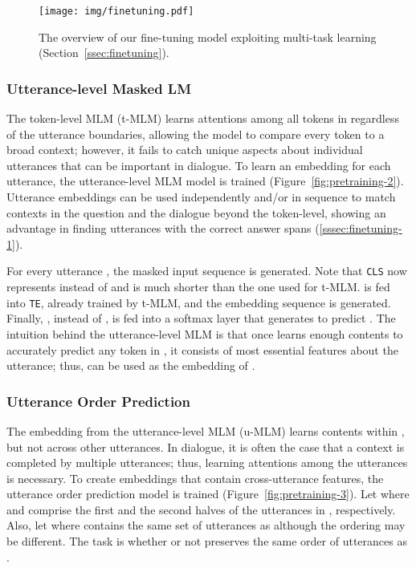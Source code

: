 \documentclass[11pt,a4paper]{article}
\newcommand{\textsec}[1]{\textsection\ref{#1}}
\begin{document}
\begin{figure*}[htbp!]
\centering
\texttt{[image: img/finetuning.pdf]}
\caption{The overview of our fine-tuning model exploiting multi-task learning (Section~\ref{ssec:finetuning}).}
\label{fig:finetuing}
\end{figure*}

\subsubsection{Utterance-level Masked LM}
\label{sssec:pretraining-2}

The token-level MLM (t-MLM) learns attentions among all tokens in  regardless of the utterance boundaries, allowing the model to compare every token to a broad context; however, it fails to catch unique aspects about individual utterances that can be important in dialogue.
To learn an embedding for each utterance, the utterance-level MLM model is trained (Figure~\ref{fig:pretraining-2}).
Utterance embeddings can be used independently and/or in sequence to match contexts in the question and the dialogue beyond the token-level, showing an advantage in finding utterances with the correct answer spans (\textsec{sssec:finetuning-1}).

\noindent For every utterance , the masked input sequence  is generated.
Note that \texttt{CLS} now represents  instead of  and  is much shorter than the one used for t-MLM.
 is fed into \texttt{TE}, already trained by t-MLM, and the embedding sequence  is generated.
Finally, , instead of , is fed into a softmax layer that generates  to predict .
The intuition behind the utterance-level MLM is that once  learns enough contents to accurately predict any token in , it consists of most essential features about the utterance; thus,  can be used as the embedding of .





\subsubsection{Utterance Order Prediction}
\label{sssec:pretraining-3}

The embedding  from the utterance-level MLM (u-MLM) learns contents within , but not across other utterances.
In dialogue, it is often the case that a context is completed by multiple utterances; thus, learning attentions among the utterances is necessary.
To create embeddings that contain cross-utterance features, the utterance order prediction model is trained (Figure~\ref{fig:pretraining-3}).
Let  where  and  comprise the first and the second halves of the utterances in , respectively.
Also, let  where  contains the same set of utterances as  although the ordering may be different.
The task is whether or not  preserves the same order of utterances as .
\end{document}
